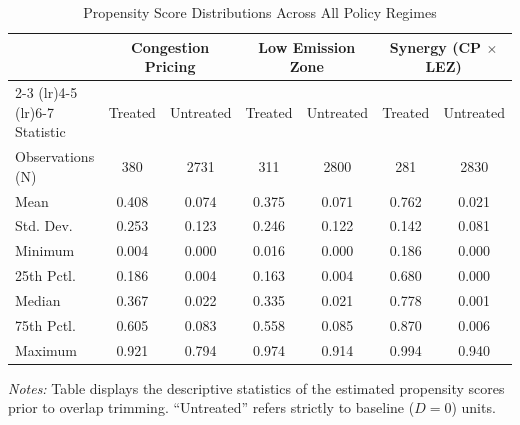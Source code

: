 \begin{table}[htbp]
\centering
\caption{Propensity Score Distributions Across All Policy Regimes}
\label{tab:propensity_scores_all}
\begin{tabular}{lcccccc}
\toprule
& \multicolumn{2}{c}{Congestion Pricing} & \multicolumn{2}{c}{Low Emission Zone} & \multicolumn{2}{c}{Synergy (CP $\times$ LEZ)} \\
\cmidrule(lr){2-3} \cmidrule(lr){4-5} \cmidrule(lr){6-7}
Statistic & Treated & Untreated & Treated & Untreated & Treated & Untreated \\
\midrule
Observations (N) & 380 & 2731 & 311 & 2800 & 281 & 2830 \\
Mean & 0.408 & 0.074 & 0.375 & 0.071 & 0.762 & 0.021 \\
Std. Dev. & 0.253 & 0.123 & 0.246 & 0.122 & 0.142 & 0.081 \\
Minimum & 0.004 & 0.000 & 0.016 & 0.000 & 0.186 & 0.000 \\
25th Pctl. & 0.186 & 0.004 & 0.163 & 0.004 & 0.680 & 0.000 \\
Median & 0.367 & 0.022 & 0.335 & 0.021 & 0.778 & 0.001 \\
75th Pctl. & 0.605 & 0.083 & 0.558 & 0.085 & 0.870 & 0.006 \\
Maximum & 0.921 & 0.794 & 0.974 & 0.914 & 0.994 & 0.940 \\
\bottomrule
\end{tabular}

\vspace{1ex}
{\raggedright \footnotesize \textit{Notes:} Table displays the descriptive statistics of the estimated propensity scores prior to overlap trimming. ``Untreated'' refers strictly to baseline ($D=0$) units.\par}
\end{table}
